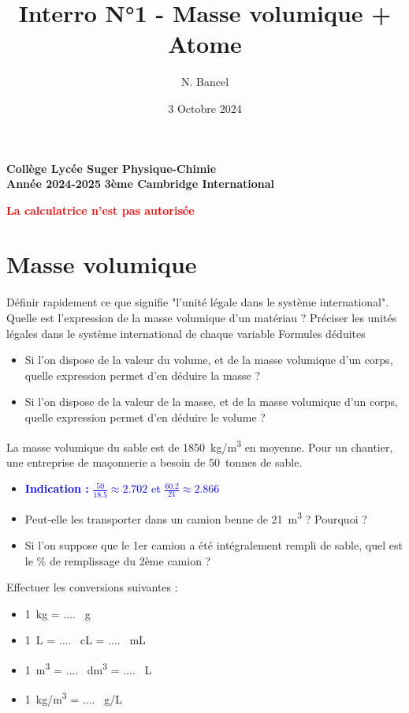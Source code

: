 \documentclass{exam}
\title{Interro N°1 - Masse volumique + Atome}
\author{N. Bancel}
\date{3 Octobre 2024}
\begin{document}
\textbf{Collège Lycée Suger}
\hfill
\textbf{Physique-Chimie} \\

\textbf{Année 2024-2025}
\hfill
\textbf{3ème Cambridge International} \par

{\let\newpage\relax\maketitle}

\begin{center}
\textbf{\textcolor{red}{La calculatrice n'est pas autorisée}}
\end{center}

\section*{Masse volumique}

\begin{questions}
  \question[0.5] Définir rapidement ce que signifie "l'unité légale dans le système international".
  \question[1] Quelle est l'expression de la masse volumique d'un matériau ? Préciser les unités légales dans le système international de chaque variable
  \question[1] Formules déduites 
  \begin{itemize}
    \item Si l'on dispose de la valeur du volume, et de la masse volumique d'un corps, quelle expression permet d'en déduire la masse ?
    \item Si l'on dispose de la valeur de la masse, et de la masse volumique d'un corps, quelle expression permet d'en déduire le volume ?
  \end{itemize}
  \question[2] La masse volumique du sable est de \SI{1850}{kg/m^3} en moyenne. Pour un chantier, une entreprise de maçonnerie a besoin de \SI{50}{tonnes} de sable.
  \begin{itemize}
    \item \textcolor{blue}{\textbf{Indication :} $\frac{50}{18.5} \approx 2.702$ et $\frac{60.2}{21} \approx 2.866$}
    \item Peut-elle les transporter dans un camion benne de \SI{21}{m^3} ? Pourquoi ?
    \item Si l'on suppose que le 1er camion a été intégralement rempli de sable, quel est le \% de remplissage du 2ème camion ?
\end{itemize}
  \question[2] Effectuer les conversions suivantes : 
  \begin{itemize}
    \item \SI{1}{kg} = .... \SI{}{g}
    \item \SI{1}{L} = .... \SI{}{cL} = .... \SI{}{mL}
    \item \SI{1}{m^3} = .... \SI{}{dm^3} = .... \SI{}{L}
    \item \SI{1}{kg/m^3} = .... \SI{}{g/L}
\end{itemize}

\end{questions}
\end{document}
